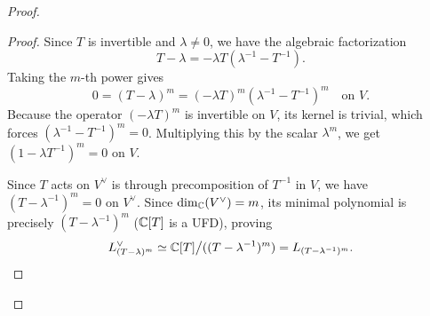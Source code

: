 \begin{proof}
\begin{proof}
        Since $T$ is invertible and $\lambda \neq 0$, we have the algebraic factorization
        \[
            T - \lambda = -\lambda T (\lambda^{-1} - T^{-1}).
        \]
        Taking the $m$-th power gives
        \[
            0 = (T - \lambda)^m = (-\lambda T)^m (\lambda^{-1} - T^{-1})^m \quad \text{on } V.
        \]
        Because the operator $(-\lambda T)^m$ is invertible on $V$, its kernel is trivial, which forces $(\lambda^{-1} - T^{-1})^m = 0$.
        Multiplying this by the scalar $\lambda^m$, we get $(1 - \lambda T^{-1})^m = 0$ on $V$.


        Since $T$ acts on $V^\vee$ is through precomposition of $T^{-1}$ in $V$, we have $(T - \lambda^{-1})^m = 0$ on $V^\vee$.
        Since $\dim_{\mathbb{C}}(V^\vee) = m$, its minimal polynomial is precisely $(T - \lambda^{-1})^m$ ($\mathbb{C}[T]$ is a UFD), proving
        \[
            L_{(T-\lambda)^m}^\vee \simeq \mathbb{C}[T]\big/((T-\lambda^{-1})^m) = L_{(T-\lambda^{-1})^m}.
        \]

    \end{proof}


\end{proof}
